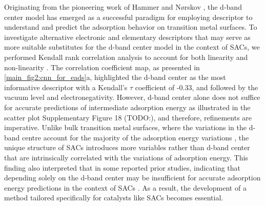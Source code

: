 Originating from the pioneering work of Hammer and Nørskov \cite{hammer2000theoretical}, the d-band center model has emerged as a successful paradigm for employing descriptor to understand and predict the adsorption behavior on transition metal surfaces.
To investigate alternative electronic and elementary descriptors that may serve as more suitable substitutes for the d-band center model in the context of SACs, we performed Kendall rank correlation analysis to account for both linearity and non-linearity \cite{kendall1938new}.
The correlation coefficient map, as presented in \cref{main_fig2:cnn_for_eads}a, highlighted the d-band center as the most informative descriptor with a Kendall's $\tau$ coefficient of -0.33, and followed by the vacuum level and electronegativity.
However, d-band center alone does not suffice for accurate predictions of intermediate adsorption energy as illustrated in the scatter plot Supplementary Figure 18 (TODO:), and therefore, refinements are imperative.
Unlike bulk transition metal surfaces, where the variations in the d-band centre account for the majority of the adsorption energy variations \cite{norskov2011density, takigawa2016machine}, the unique structure of SACs introduces more variables rather than d-band center that are intrinsically correlated with the variations of adsorption energy.
This finding also interpreted that in some reported prior studies, indicating that depending solely on the d-band center may be insufficient for accurate adsorption energy predictions in the context of SACs \cite{sun2022going, fung2020descriptors, di2022universal, yuan2020descriptor, huang2020rational}.
As a result, the development of a method tailored specifically for catalysts like SACs becomes essential.

